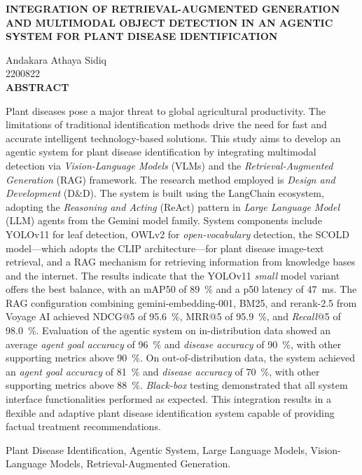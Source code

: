 \documentclass[12pt, a4paper, oneside]{report}
\newcommand{\wordonespacing}{0.955212}
\newenvironment{abstract-en}{
    \clearpage
    \setstretch{\wordonespacing}
    \fontsize{11pt}{13pt}\selectfont
    \itshape
}{
    \par
}
\newcommand{\thesistitleen}{INTEGRATION OF RETRIEVAL-AUGMENTED GENERATION AND MULTIMODAL OBJECT DETECTION IN AN AGENTIC SYSTEM FOR PLANT DISEASE IDENTIFICATION}
\newcommand{\authorname}{Andakara Athaya Sidiq}
\newcommand{\studentid}{2200822}
\begin{document}
\begin{abstract-en}
    \begin{center}
        {\bfseries \MakeUppercase{\thesistitleen} \par}
        \vspace{2em}
        \authorname \\
        \studentid \\
        \vspace{2em}
        {\bfseries ABSTRACT}
    \end{center}
    \vspace{-0.5em}
    Plant diseases pose a major threat to global agricultural productivity. The limitations of traditional identification methods drive the need for fast and accurate intelligent technology-based solutions. This study aims to develop an agentic system for plant disease identification by integrating multimodal detection via \textit{Vision-Language Models} (VLMs) and the \textit{Retrieval-Augmented Generation} (RAG) framework. The research method employed is \textit{Design and Development} (D\&D). The system is built using the LangChain ecosystem, adopting the \textit{Reasoning and Acting} (ReAct) pattern in \textit{Large Language Model} (LLM) agents from the Gemini model family. System components include YOLOv11 for leaf detection, OWLv2 for \textit{open-vocabulary} detection, the SCOLD model—which adopts the CLIP architecture—for plant disease image-text retrieval, and a RAG mechanism for retrieving information from knowledge bases and the internet. The results indicate that the YOLOv11 \textit{small} model variant offers the best balance, with an mAP50 of \qty{89}{\percent} and a p50 latency of \qty{47}{ms}. The RAG configuration combining gemini-embedding-001, BM25, and rerank-2.5 from Voyage AI achieved NDCG@5 of \qty{95.6}{\percent}, MRR@5 of \qty{95.9}{\percent}, and \textit{Recall}@5 of \qty{98.0}{\percent}. Evaluation of the agentic system on in-distribution data showed an average \textit{agent goal accuracy} of \qty{96}{\percent} and \textit{disease accuracy} of \qty{90}{\percent}, with other supporting metrics above \qty{90}{\percent}. On out-of-distribution data, the system achieved an \textit{agent goal accuracy} of \qty{81}{\percent} and \textit{disease accuracy} of \qty{70}{\percent}, with other supporting metrics above \qty{88}{\percent}. \textit{Black-box} testing demonstrated that all system interface functionalities performed as expected. This integration results in a flexible and adaptive plant disease identification system capable of providing factual treatment recommendations.
    
    \vspace{1em}
     Plant Disease Identification, Agentic System, Large Language Models, Vision-Language Models, Retrieval-Augmented Generation.
\end{abstract-en}
\end{document}
